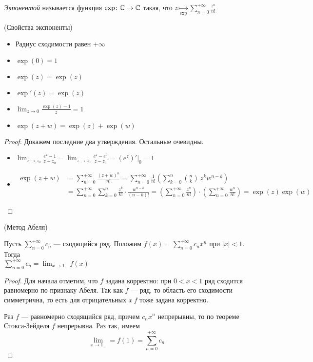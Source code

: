 \begin{definition}
    \textit{Экпонентой} называется функция $\exp \colon \mathbb{C} \to \mathbb{C}$ такая,
    что $\displaystyle z \underset{\exp}{\mapsto} \sum_{n =
    0}^{+\infty}{\frac{z^n}{n!}}$
\end{definition}

\begin{theorem}(Свойства экспоненты)

    \begin{itemize}
        \item Радиус сходимости равен $+\infty$
        \item $\exp(0) = 1$
        \item $\overline{\exp}(z) = \exp(z)$
        \item $\exp'(z) = \exp(z)$
        \item $\displaystyle \lim_{z \to 0}{\frac{\exp(z) - 1}{z}} = 1$
        \item $\exp(z + w) = \exp(z) + \exp(w)$
    \end{itemize}
\end{theorem}
\begin{proof}
    Докажем последние два утверждения. Остальные очевидны.
    \begin{itemize}
        \item
$ \displaystyle
    \lim_{z \to z_0}{\frac{e^z - 1}{z - z_0}}
    = \lim_{z \to z_0}{\frac{e^z - e^0}{z - z_0}}
    = (e^z)'\bigg|_0 = 1
$
        \item
\begin{align*}
    \exp(z + w) &= \sum_{n = 0}^{+\infty}{\frac{(z + w)^n}{n!}}
    = \sum_{n = 0}^{+\infty}{\frac{1}{n!}\left(
    \sum_{k = 0}^{n}{\binom{n}{k}~z^k w^{n - k}}\right)} \\
    &= \sum_{n = 0}^{+\infty}{\sum_{k = 0}^{n}}{\frac{z^k}{k!}
    \cdot \frac{w^{n - k}}{(n - k)!}}
    = \left(\sum_{n = 0}^{+\infty}{\frac{z^n}{n!}}\right)
    \cdot \left(\sum_{n = 0}^{+\infty}{\frac{w^n}{n!}}\right)
    = \exp(z)\exp(w)
\end{align*}
    \end{itemize}
\end{proof}

\begin{theorem}(Метод Абеля)

    Пусть $\displaystyle \sum_{n = 0}^{+\infty}{c_n}$ --- сходящийся ряд.
    Положим $\displaystyle f(x) = \sum_{n = 0}^{+\infty}{c_n x^n}$ при $|x| <
    1$. Тогда \\ $\displaystyle \sum_{n = 0}^{+\infty}{c_n} = \lim_{x \to 1_{-
    }}{f(x)}$
\end{theorem}
\begin{proof}
    Для начала отметим, что $f$ задана корректно: при $0 < x < 1$ ряд сходится
    равномерно по признаку Абеля. Так как $f$ --- ряд, то область его сходимости
    симметрична, то есть для отрицательных $x~f$ тоже задана корректно.

    Раз $f$ --- равномерно сходящийся ряд, причем $c_n x^n$ непрерывны, то по
    теореме Стокса-Зейделя $f$ непрерывна. Раз так, имеем
\[
    \lim_{x \to 1_{-}} = f(1) = \sum_{n = 0}^{+\infty}{c_n}
\]
\end{proof}

